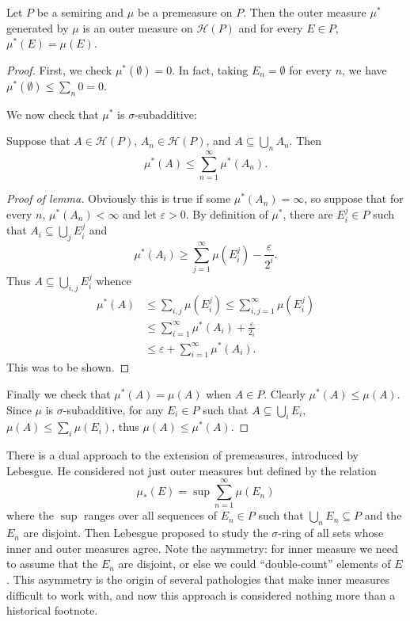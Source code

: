\begin{theorem}
Let $P$ be a semiring and $\mu$ be a premeasure on $P$. Then the outer measure $\mu^{*}$ generated by $\mu$ is an outer measure on $\mathcal H(P)$ and for every $E \in P$, $\mu^{*}(E) = \mu(E)$.
\end{theorem}
\begin{proof}
First, we check $\mu^{*}(\emptyset) = 0$. In fact, taking $E_{n} = \emptyset$ for every $n$, we have $\mu^{*}(\emptyset) \leq \sum_{n} 0 = 0$.

We now check that $\mu^{*}$ is $\sigma$-subadditive:
\begin{lemma}
Suppose that $A \in \mathcal H(P)$, $A_{n} \in \mathcal H(P)$, and $A \subseteq \bigcup_{n} A_{n}$. Then
\[\mu^{*}(A) \leq \sum_{n=1}^{\infty} \mu^{*}(A_{n}).\]
\end{lemma}
\begin{proof}[Proof of lemma]
Obviously this is true if some $\mu^{*}(A_{n}) = \infty$, so suppose that for every $n$, $\mu^{*}(A_{n}) < \infty$ and let $\varepsilon > 0$.
By definition of $\mu^{*}$, there are $E_{i}^{j} \in P$ such that $A_{i} \subseteq \bigcup_{j} E_{i}^{j}$
and
\[\mu^{*}(A_{i}) \geq \sum_{j=1}^{\infty} \mu(E_{i}^{j}) - \frac{\varepsilon}{2^{i}}.\]
Thus $A \subseteq \bigcup_{i,j}E_{i}^{j}$ whence
\begin{align*}\mu^{*}(A) &\leq \sum_{i,j} \mu(E_{i}^{j}) \leq \sum_{i,j=1}^{\infty} \mu(E_{i}^{j})\\ &\leq \sum_{i=1}^{\infty} \mu^{*}(A_{i}) + \frac{\varepsilon}{2_{i}}\\& \leq \varepsilon + \sum_{i=1}^{\infty} \mu^{*}(A_{i}).\end{align*}
This was to be shown.
\end{proof}

Finally we check that $\mu^{*}(A) = \mu(A)$ when $A \in P$. Clearly $\mu^{*}(A) \leq \mu(A)$.
Since $\mu$ is $\sigma$-subadditive, for any $E_{i} \in P$ such that $A \subseteq \bigcup_{i} E_{i}$, $\mu(A) \leq \sum_{i} \mu(E_{i})$, thus $\mu(A) \leq \mu^{*}(A)$.
\end{proof}

\begin{subsec}
There is a dual approach to the extension of premeasures, introduced by Lebesgue.
He considered not just outer measures but  defined by the relation
\[\mu_{*}(E) = \sup \sum_{n=1}^{\infty} \mu(E_{n})\]
where the $\sup$ ranges over all sequences of $E_{n} \in P$ such that $\bigcup_{n} E_{n} \subseteq P$ and the $E_{n}$ are disjoint.
Then Lebesgue proposed to study the $\sigma$-ring of all sets whose inner and outer measures agree.
Note the asymmetry: for inner measure we need to assume that the $E_{n}$ are disjoint, or else we could ``double-count'' elements of $E$.
This asymmetry is the origin of several pathologies that make inner measures difficult to work with, and now this approach is considered nothing more than a historical footnote.
\end{subsec}

